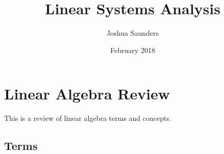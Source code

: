 \documentclass{article}
\title{Linear Systems Analysis}
\author{Joshua Saunders}
\date{February 2018}
\begin{document}
\maketitle

\section{Linear Algebra Review}

This is a review of linear algebra terms and concepts.

\subsection{Terms}
 




\end{document}
